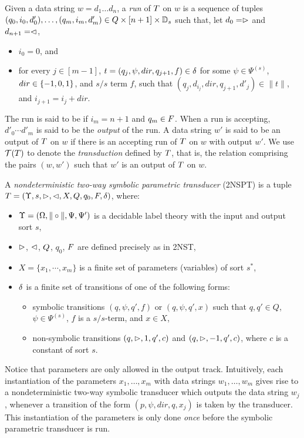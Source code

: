 Given a data string $w = d_1 \dots d_n$, a \emph{run} of $T$ on $w$
is a sequence of tuples $(q_0, i_0, d'_0), \ldots, (q_m, i_m, d'_m) \in Q \times [n+1] \times \mathbb{D}_s$ 
such that, let $d_0 = \vartriangleright$ and $d_{n+1} = \vartriangleleft$, %
\begin{itemize}
    \item $i_0 = 0$, and
    \item for every $j \in [m-1]$, $t=(q_j, \psi, dir, q_{j+1}, f) \in \delta$ for some $\psi \in \Psi^{(s)}$, $dir \in \{-1, 0, 1\}$, and $s/s$ term $f$, such that $(q_j, d_{i_j}, dir, q_{j+1}, d'_j) \in \|t\|$, and $i_{j+1} = i_j + dir$.
\end{itemize}
The run is said to be  if $i_m = n+1$ and $q_m \in F$. When a run is accepting, $d'_0 \cdots d'_m$ is said to be the \emph{output} of the run.
A data string $w'$ is said to be an output of $T$ on $w$ if there is an accepting run of
$T$ on $w$ with output $w'$. We use $\mathcal{T}(T)$ to denote the \emph{transduction} defined by $T$, that is, the relation comprising the pairs $(w, w')$ such that $w'$ is an output of $T$ on $w$.



\begin{definition}
A \emph{nondeterministic two-way symbolic parametric transducer} (2NSPT) is a tuple
$T=(\Upsilon, s,  \vartriangleright, \vartriangleleft, X, Q, q_0, F, \delta)$, where:
\begin{itemize}
\item $\Upsilon=(\Omega, \| \circ \|, \Psi, \Psi')$ is a decidable label theory with the input and output sort $s$,
%
\item $\vartriangleright$, $\vartriangleleft$, $Q$, $q_0$, $F$ are defined precisely as in 2NST, 
%
\item $X=\{x_1,\cdots, x_m\}$ is a finite set of parameters (variables) of sort $s^*$, 
%
\item $\delta$ is a finite set of transitions of one of the following forms: 
\begin{itemize}
\item symbolic transitions $(q, \psi, q', f)$ or $(q, \psi, q', x)$ such that $q,q' \in Q$, $\psi \in \Psi^{(s)}$,
$f$ is a $s/s$-term, and $x \in X$,
%
\item non-symbolic transitions $(q, \vartriangleright, 1, q', c)$ and $(q, \vartriangleright, -1, q', c)$, where $c$ is a constant of sort $s$. 
\end{itemize}
\end{itemize}
\end{definition}

Notice that parameters are only allowed in the output track.
Intuitively, each instantiation of the parameters $x_1,\ldots, x_m$ with data strings 
$w_1,\ldots, w_m$ gives rise to a nondeterministic two-way symbolic transducer which outputs
the data string $w_j$, whenever a transition of the form $(p, \psi, dir, q, x_j)$ is
taken by the transducer. This instantiation of the parameters is only done 
\emph{once} before the symbolic parametric transducer is run.


